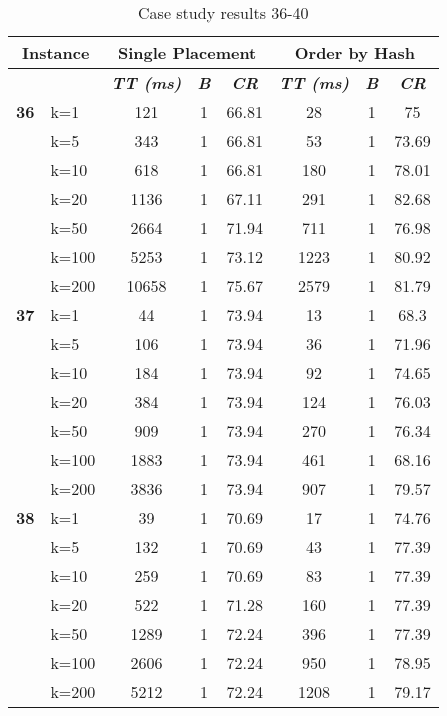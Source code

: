     \begin{table}[htbp]
    \caption{Case study results 36-40}
    \centering
    \begin{tabular}{|l|l|c|c|c|c|c|c|}
    \hline
    \multicolumn{ 2}{|c|}{\textbf{Instance}} & \multicolumn{ 3}{c|}{\textbf{Single Placement}} & \multicolumn{ 3}{c|}{\textbf{Order by Hash}} \\ \hline
    \multicolumn{ 2}{|l|}{} & \textbf{\textit{TT (ms)}} & \textbf{\textit{B}} & \textbf{\textit{CR}} & \textbf{\textit{TT (ms)}} & \textbf{\textit{B}} & \textbf{\textit{CR}} \\ \hline
    \multicolumn{1}{|r|}{\textbf{36}} & k=1 & 121 & 1 & 66.81 & 28 & 1 & 75 \\ 
     & k=5 & 343 & 1 & 66.81 & 53 & 1 & 73.69 \\ 
     & k=10 & 618 & 1 & 66.81 & 180 & 1 & 78.01 \\ 
     & k=20 & 1136 & 1 & 67.11 & 291 & 1 & 82.68 \\ 
     & k=50 & 2664 & 1 & 71.94 & 711 & 1 & 76.98 \\ 
     & k=100 & 5253 & 1 & 73.12 & 1223 & 1 & 80.92 \\ 
     & k=200 & 10658 & 1 & 75.67 & 2579 & 1 & 81.79 \\ \hline
    \multicolumn{1}{|r|}{\textbf{37}} & k=1 & 44 & 1 & 73.94 & 13 & 1 & 68.3 \\ 
     & k=5 & 106 & 1 & 73.94 & 36 & 1 & 71.96 \\ 
     & k=10 & 184 & 1 & 73.94 & 92 & 1 & 74.65 \\ 
     & k=20 & 384 & 1 & 73.94 & 124 & 1 & 76.03 \\ 
     & k=50 & 909 & 1 & 73.94 & 270 & 1 & 76.34 \\ 
     & k=100 & 1883 & 1 & 73.94 & 461 & 1 & 68.16 \\ 
     & k=200 & 3836 & 1 & 73.94 & 907 & 1 & 79.57 \\ \hline
    \multicolumn{1}{|r|}{\textbf{38}} & k=1 & 39 & 1 & 70.69 & 17 & 1 & 74.76 \\ 
     & k=5 & 132 & 1 & 70.69 & 43 & 1 & 77.39 \\ 
     & k=10 & 259 & 1 & 70.69 & 83 & 1 & 77.39 \\ 
     & k=20 & 522 & 1 & 71.28 & 160 & 1 & 77.39 \\ 
     & k=50 & 1289 & 1 & 72.24 & 396 & 1 & 77.39 \\ 
     & k=100 & 2606 & 1 & 72.24 & 950 & 1 & 78.95 \\ 
     & k=200 & 5212 & 1 & 72.24 & 1208 & 1 & 79.17 \\ \hline

\end{tabular}
\end{table}
